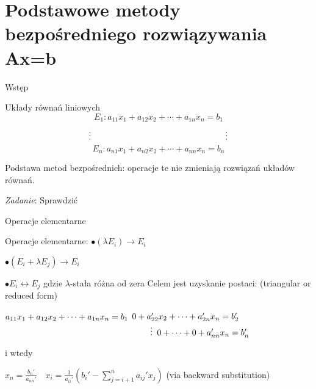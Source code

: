 \section{Podstawowe metody bezpośredniego rozwiązywania Ax=b}
\begin{frame}{Wstęp}
\begin{block}{Układy równań liniowych}
$$
E_{1}:a_{11}x_{1}+a_{12}x_{2}+\cdots+a_{1n}x_{n}=b_{1}
$$
$$
\vdots \hspace{55.5mm} \vdots
$$
$$
E_{n}:a_{n1}x_{1}+a_{n2}x_{2}+\cdots+a_{nn}x_{n}=b_{n}
$$

\end{block}
Podstawa metod bezpośrednich: operacje te nie zmieniają rozwiązań układów równań.
\begin{flushright}
{\it Zadanie}: Sprawdzić
\end{flushright} 
\end{frame}
\begin{frame}{Operacje elementarne}

Operacje elementarne: \newline
$\bullet(\lambda E_{i})\rightarrow E_{i}$

$\bullet(E_{i}+\lambda E_{j})\rightarrow E_{i}$

$\bullet E_{i}\leftrightarrow E_{j}$ \newline
gdzie $\lambda$-stała różna od zera \newline
Celem jest uzyskanie postaci: (triangular or reduced form)
\begin{flushright}
$a_{11}x_{1}+a_{12}x_{2}+\cdots+a_{1n}x_{n}=b_{1} \linebreak$
$0+a_{22}'x_{2}+\cdots+a_{2n}'x_{n}=b_{2}'
 \linebreak$
$ \hspace{60mm} \vdots \linebreak$
$0+\cdots+0+a_{nn}'x_{n}=b_{n}' \linebreak$
\end{flushright}
$\mathrm{i}$ wtedy

$ x_{n}=  \frac{b_{n}'}{a_{nn}'}\quad x_{i}= \frac{1}{a_{ii}'}(b_{i}'-\displaystyle \sum_{j=i+1}^{n} a_{ij}'x_{j})$ (via backward substitution)
\end{frame}
